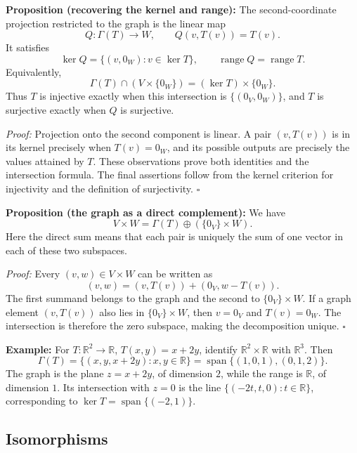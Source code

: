 \documentclass[a4paper,11pt,abstract=true]{scrartcl}
\theoremstyle{dotlessP}
\theoremstyle{dotlessS}
\theoremstyle{remark}
\theoremstyle{definition}
\begin{document}
\begin{claim_box}
\textbf{Proposition (recovering the kernel and range):} The
second-coordinate projection restricted to the graph is the linear map
\[
Q:\Gamma(T)\longrightarrow W,\qquad Q(v,T(v))=T(v).
\]
It satisfies
\[
\ker Q=\{(v,0_W):v\in\ker T\},\qquad
\operatorname{range}Q=\operatorname{range}T.
\]
Equivalently,
\[
\Gamma(T)\cap(V\times\{0_W\})=(\ker T)\times\{0_W\}.
\]
Thus $T$ is injective exactly when this intersection is
$\{(0_V,0_W)\}$, and $T$ is surjective exactly when $Q$ is surjective.

\textit{Proof:} Projection onto the second component is linear.
A pair $(v,T(v))$ is in its kernel precisely when $T(v)=0_W$,
and its possible outputs are precisely the values attained by $T$.
These observations prove both identities and the intersection formula.
The final assertions follow from the kernel criterion for injectivity
and the definition of surjectivity. \hfill$\square$
\end{claim_box}

\begin{claim_box}
\textbf{Proposition (the graph as a direct complement):} We have
\[
V\times W=\Gamma(T)\oplus(\{0_V\}\times W).
\]
Here the direct sum means that each pair is uniquely the sum of one
vector in each of these two subspaces.

\textit{Proof:} Every $(v,w)\in V\times W$ can be written as
\[
(v,w)=(v,T(v))+(0_V,w-T(v)).
\]
The first summand belongs to the graph and the second to
$\{0_V\}\times W$. If a graph element $(v,T(v))$ also lies in
$\{0_V\}\times W$, then $v=0_V$ and $T(v)=0_W$. The intersection
is therefore the zero subspace, making the decomposition unique.
\hfill$\square$
\end{claim_box}

\begin{example_box}
\textbf{Example:} For $T:\mathbb{R}^2\longrightarrow\mathbb{R}$,
$T(x,y)=x+2y$, identify $\mathbb{R}^2\times\mathbb{R}$ with
$\mathbb{R}^3$. Then
\[
\Gamma(T)=\{(x,y,x+2y):x,y\in\mathbb{R}\}
=\operatorname{span}\{(1,0,1),(0,1,2)\}.
\]
The graph is the plane $z=x+2y$, of dimension $2$, while the range is
$\mathbb{R}$, of dimension $1$. Its intersection with $z=0$ is the
line $\{(-2t,t,0):t\in\mathbb{R}\}$, corresponding to
$\ker T=\operatorname{span}\{(-2,1)\}$.
\end{example_box}

\subsection{Isomorphisms}
\end{document}
